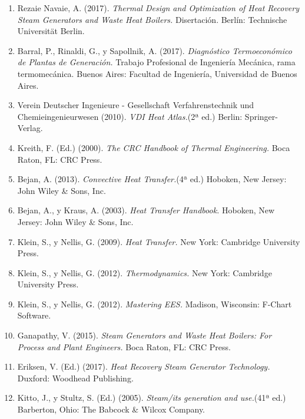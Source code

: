 \documentclass[a4paper]{article}
\begin{document}
\begin{enumerate}

\item Rezaie Navaie, A. (2017). \textit{Thermal Design and Optimization of Heat Recovery Steam Generators and Waste Heat Boilers.} Disertación. Berlín: Technische Universität Berlin.

\item Barral, P., Rinaldi, G., y Sapollnik, A. (2017). \textit{Diagnóstico Termoeconómico de Plantas de Generación.} Trabajo Profesional de Ingeniería Mecánica, rama termomecánica. Buenos Aires: Facultad de Ingeniería, Universidad de Buenos Aires.

\item Verein Deutscher Ingenieure - Gesellschaft Verfahrenstechnik und Chemieingenieurwesen (2010). \textit{VDI Heat Atlas.}(2ª ed.) Berlin: Springer-Verlag.

\item Kreith, F. (Ed.) (2000). \textit{The CRC Handbook of Thermal Engineering.} Boca Raton, FL: CRC Press.

\item Bejan, A. (2013). \textit{Convective Heat Transfer.}(4ª ed.) Hoboken, New Jersey: John Wiley \& Sons, Inc.

\item Bejan, A., y Kraus, A. (2003). \textit{Heat Transfer Handbook.} Hoboken, New Jersey: John Wiley \& Sons, Inc.

\item Klein, S., y Nellis, G. (2009). \textit{Heat Transfer.} New York: Cambridge University Press.

\item Klein, S., y Nellis, G. (2012). \textit{Thermodynamics.} New York: Cambridge University Press.

\item Klein, S., y Nellis, G. (2012). \textit{Mastering EES.} Madison, Wisconsin: F-Chart Software.

\item Ganapathy, V. (2015). \textit{Steam Generators and Waste Heat Boilers: For Process and Plant Engineers.} Boca Raton, FL: CRC Press.

\item Eriksen, V. (Ed.) (2017). \textit{Heat Recovery Steam Generator Technology.} Duxford: Woodhead Publishing.

\item Kitto, J., y Stultz, S. (Ed.)  (2005). \textit{Steam/its generation and use.}(41ª ed.) Barberton, Ohio: The Babcock \& Wilcox Company.

\end{enumerate}
\end{document}
